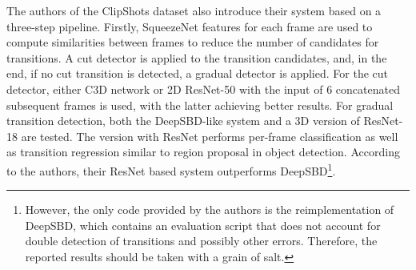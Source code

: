 The authors of the ClipShots dataset also introduce their system based on a three-step pipeline. Firstly, SqueezeNet \cite{SqueezeNet} features for each frame are used to compute similarities between frames to reduce the number of candidates for transitions. A cut detector is applied to the transition candidates, and, in the end, if no cut transition is detected, a gradual detector is applied. For the cut detector, either C3D network or 2D ResNet-50 with the input of 6 concatenated subsequent frames is used, with the latter achieving better results. For gradual transition detection, both the DeepSBD-like system and a 3D version of ResNet-18 \cite{Hara_2018_CVPR} are tested. The version with ResNet performs per-frame classification as well as transition regression similar to region proposal in object detection. According to the authors, their ResNet based system outperforms DeepSBD\footnote{However, the only code provided by the authors is the reimplementation of DeepSBD, which contains an evaluation script that does not account for double detection of transitions and possibly other errors. Therefore, the reported results should be taken with a grain of salt.}.

